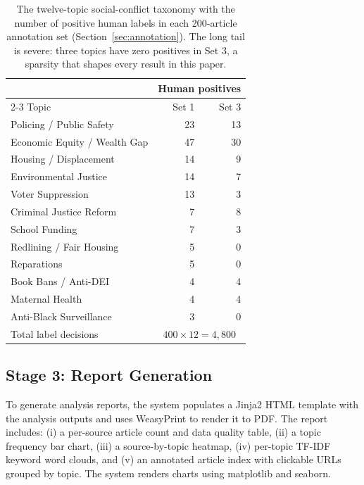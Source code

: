 \documentclass[letterpaper]{article}
\begin{document}
\begin{table}[t]
\centering
\small
\begin{tabular}{lrr}
\toprule
& \multicolumn{2}{c}{Human positives} \\
\cmidrule(lr){2-3}
Topic & Set 1 & Set 3 \\
\midrule
Policing / Public Safety        & 23 & 13 \\
Economic Equity / Wealth Gap    & 47 & 30 \\
Housing / Displacement          & 14 &  9 \\
Environmental Justice           & 14 &  7 \\
Voter Suppression               & 13 &  3 \\
Criminal Justice Reform         &  7 &  8 \\
School Funding                  &  7 &  3 \\
Redlining / Fair Housing        &  5 &  0 \\
Reparations                     &  5 &  0 \\
Book Bans / Anti-DEI            &  4 &  4 \\
Maternal Health                 &  4 &  4 \\
Anti-Black Surveillance         &  3 &  0 \\
\midrule
Total label decisions           & \multicolumn{2}{c}{$400 \times 12 = 4{,}800$} \\
\bottomrule
\end{tabular}
\caption{The twelve-topic social-conflict taxonomy with the number of
positive human labels in each 200-article annotation set
(Section~\ref{sec:annotation}). The long tail is severe: three topics
have zero positives in Set 3, a sparsity that shapes every result in
this paper.}
\label{tab:taxonomy}
\end{table}

\subsection{Stage 3: Report Generation}

To generate analysis reports, the system populates a Jinja2 HTML
template with the analysis outputs and uses WeasyPrint
\citep{weasyprint2021} to render it to PDF. The report includes: (i) a
per-source article count and data quality table, (ii) a topic frequency
bar chart, (iii) a source-by-topic heatmap, (iv) per-topic TF-IDF
keyword word clouds, and (v) an annotated article index with clickable
URLs grouped by topic. The system renders charts using matplotlib and
seaborn.
\end{document}
